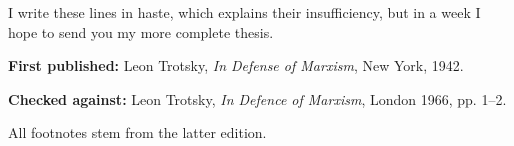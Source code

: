 I write these lines in haste, which explains their insufficiency, but in a week I hope to send you my more complete thesis.


\hrulefill

\begin{letterinfo}
  \textbf{First published:} Leon Trotsky, \emph{In Defense of Marxism}, New York, 1942.
	
  \textbf{Checked against:} Leon Trotsky, \emph{In Defence of Marxism}, London 1966, pp. 1--2.
	
  All footnotes stem from the latter edition.
\end{letterinfo}